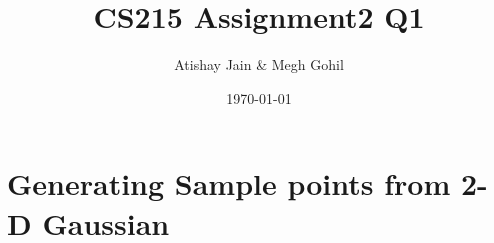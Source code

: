 \documentclass{article}
\title{CS215 Assignment2 Q1}
\author{Atishay Jain \& Megh Gohil}
\date{\today}
\begin{document}
    \maketitle

    \section{Generating Sample points from 2-D Gaussian}
\end{document}
